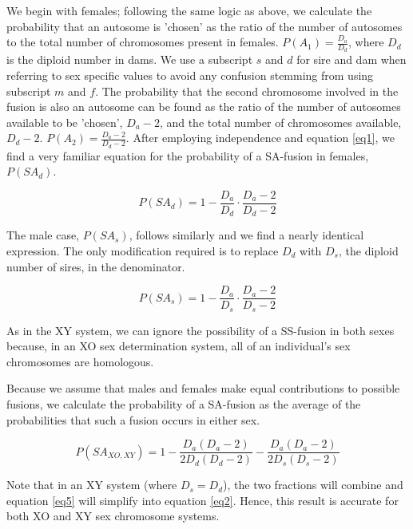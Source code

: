 \documentclass[12pt]{article}
\begin{document}
We begin with females; following the same logic as above, we calculate the probability that an autosome is 'chosen' as the ratio of the number of autosomes to the total number of chromosomes present in females.
$P(A_1) = \frac{D_a}{D_d}$, where $D_d$ is the diploid number in dams. 
We use a subscript $s$ and $d$ for sire and dam when referring to sex specific values to avoid any confusion stemming from using subscript $m$ and $f$.
The probability that the second chromosome involved in the fusion is also an autosome can be found as the ratio of the number of autosomes available to be 'chosen', $D_a - 2$, and the total number of chromosomes available, $D_d - 2$. 
$P(A_2) = \frac{D_a - 2}{D_d - 2}$. 
After employing independence and equation \ref{eq1}, we find a very familiar equation for the probability of a SA-fusion in females, $P(SA_d)$. 

\begin{equation} \label{eq3}
    P(SA_d) =  1 - \frac{D_a}{D_d} \cdot \frac{D_a - 2}{D_d - 2}
\end{equation}

The male case, $P(SA_s)$, follows similarly and we find a nearly identical expression.
The only modification required is to replace $D_d$ with $D_s$, the diploid number of sires, in the denominator.

\begin{equation} \label{eq4}
    P(SA_s) = 1 - \frac{D_a}{D_s} \cdot \frac{D_a - 2}{D_s - 2}
\end{equation}

As in the XY system, we can ignore the possibility of a SS-fusion in both sexes because, in an XO sex determination system, all of an individual's sex chromosomes are homologous.

Because we assume that males and females make equal contributions to possible fusions, we calculate the probability of a SA-fusion as the average of the probabilities that such a fusion occurs in either sex.

    \begin{equation} \label{eq5}
        P(SA_{XO,XY}) = 1 - \frac{D_a  (D_a - 2)}{2 D_d  (D_d - 2)} - \frac{D_a  (D_a - 2)}{2 D_s  (D_s - 2)}
    \end{equation}
    
Note that in an XY system (where $D_s = D_d$), the two fractions will combine and equation \ref{eq5} will simplify into equation \ref{eq2}. 
Hence, this result is accurate for both XO and XY sex chromosome systems.
 
\end{document}
